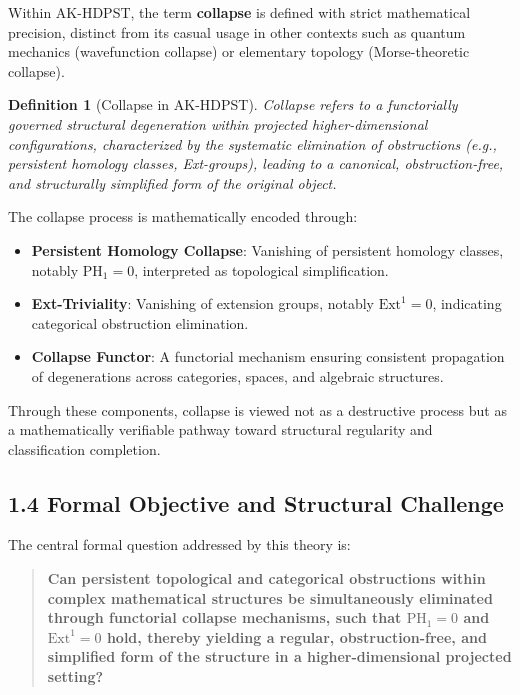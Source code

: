 \documentclass[11pt]{article}
\newtheorem{definition}[theorem]{Definition}
\begin{document}
Within AK-HDPST, the term \textbf{collapse} is defined with strict mathematical precision, distinct from its casual usage in other contexts such as quantum mechanics (wavefunction collapse) or elementary topology (Morse-theoretic collapse).

\begin{definition}[Collapse in AK-HDPST]
Collapse refers to a functorially governed structural degeneration within projected higher-dimensional configurations,  
characterized by the systematic elimination of obstructions (e.g., persistent homology classes, Ext-groups),  
leading to a canonical, obstruction-free, and structurally simplified form of the original object.
\end{definition}

The collapse process is mathematically encoded through:

\begin{itemize}
    \item \textbf{Persistent Homology Collapse}: Vanishing of persistent homology classes, notably $\mathrm{PH}_1 = 0$, interpreted as topological simplification.
    \item \textbf{Ext-Triviality}: Vanishing of extension groups, notably $\mathrm{Ext}^1 = 0$, indicating categorical obstruction elimination.
    \item \textbf{Collapse Functor}: A functorial mechanism ensuring consistent propagation of degenerations across categories, spaces, and algebraic structures.
\end{itemize}

Through these components, collapse is viewed not as a destructive process but as a mathematically verifiable pathway toward structural regularity and classification completion.

\subsection*{1.4 Formal Objective and Structural Challenge}

The central formal question addressed by this theory is:

\begin{quote}
\textbf{Can persistent topological and categorical obstructions within complex mathematical structures be simultaneously eliminated  
through functorial collapse mechanisms, such that $\mathrm{PH}_1 = 0$ and $\mathrm{Ext}^1 = 0$ hold,  
thereby yielding a regular, obstruction-free, and simplified form of the structure in a higher-dimensional projected setting?}
\end{quote}
\end{document}
